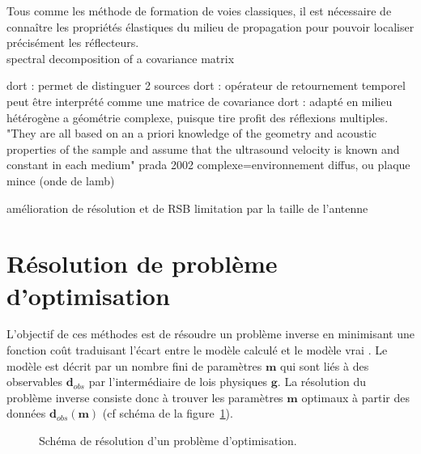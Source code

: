Tous comme les méthode de formation de voies classiques, il est nécessaire de connaître les propriétés élastiques du milieu de propagation pour pouvoir localiser précisément les réflecteurs.\\


spectral decomposition of a covariance matrix

dort : permet de distinguer 2 sources
dort : opérateur de retournement temporel peut être interprété comme une matrice de covariance
dort : adapté en milieu hétérogène a géométrie complexe, puisque tire profit des réflexions multiples. "They are all based on an a priori
knowledge of the geometry and acoustic properties of the sample and assume that the ultrasound
velocity is known and constant in each medium" prada 2002 complexe=environnement diffus, ou plaque mince (onde de lamb)


amélioration de résolution et de RSB
limitation par la taille de l'antenne

\section{Résolution de problème d'optimisation}

L'objectif de ces méthodes est de résoudre un problème inverse en minimisant une fonction coût traduisant l'écart entre le modèle calculé et le modèle vrai \citep{tarantola_book}. Le modèle est décrit par un nombre fini de paramètres $\bm{m}$ qui sont liés à des observables $\bm{d}_{obs}$ par l'intermédiaire de lois physiques $\bm{g}$. La résolution du problème inverse consiste donc à trouver les paramètres $\bm{m}$ optimaux à partir des données $\bm{d}_{obs}(\bm{m})$ (cf schéma de la figure~\ref{pb_inv}). 

\begin{figure}[!h]
	\centering
	\caption{\label{pb_inv} Schéma de résolution d'un problème d'optimisation.}
\end{figure}

